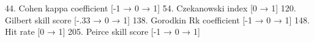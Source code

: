 {\bftt{>              }}
44. Cohen kappa coefficient      [-1 → 0 → 1]  {}
{\bftt{>              }}
54. Czekanowski index                 [0 → 1]  {}
{}
120. Gilbert skill score       [-.33 → 0 → 1]  {}
{}
138. Gorodkin Rk coefficient     [-1 → 0 → 1]  {}
{\bftt{>              }}
148. Hit rate                         [0 → 1]  {}
{}
205. Peirce skill score          [-1 → 0 → 1]  {}
{\bftt{>              }}
